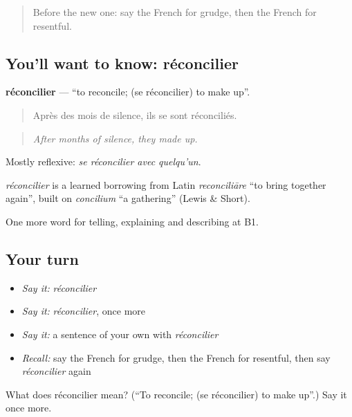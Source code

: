 \label{lesson:FR-C475-reconcilier}



\begin{quote}
Before the new one: say the French for grudge, then the French for resentful.
\end{quote}

\subsection*{You'll want to know: réconcilier}
\textbf{réconcilier} — \textquotedblleft{}to reconcile; (se réconcilier) to make up\textquotedblright{}.

\begin{quote}
Après des mois de silence, ils se sont réconciliés.
\end{quote}

\begin{quote}
\emph{After months of silence, they made up.}
\end{quote}

Mostly reflexive: \emph{se réconcilier avec quelqu'un}.

\begin{cousinweb}
\emph{réconcilier} is a learned borrowing from Latin \emph{reconciliāre} \textquotedblleft{}to bring together again\textquotedblright{}, built on \emph{concilium} \textquotedblleft{}a gathering\textquotedblright{} (Lewis \& Short).
\end{cousinweb}

\begin{grammarlens}[title={What you've built}]
One more word for telling, explaining and describing at B1.
\end{grammarlens}

\subsection*{Your turn}
\begin{itemize}
\raggedright
  \item \emph{Say it:} \emph{réconcilier}
  \item \emph{Say it:} \emph{réconcilier}, once more
  \item \emph{Say it:} a sentence of your own with \emph{réconcilier}
  \item \emph{Recall:} say the French for grudge, then the French for resentful, then say \emph{réconcilier} again
\end{itemize}

\begin{tcolorbox}[breakable,colback=teal!4,colframe=teal!35!black,title={Before you move on}]
What does réconcilier mean? (\textquotedblleft{}To reconcile; (se réconcilier) to make up\textquotedblright{}.) Say it once more.
\end{tcolorbox}
